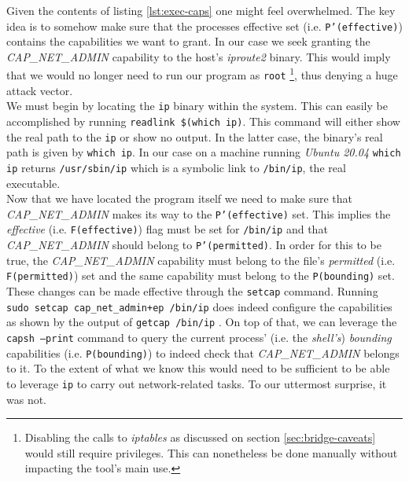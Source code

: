         Given the contents of listing \ref{lst:exec-caps} one might feel overwhelmed. The key idea is to somehow make sure that the processes effective set (i.e. \texttt{P'(effective)}) contains the capabilities we want to grant. In our case we seek granting the \textit{CAP\_NET\_ADMIN} capability to the host's \textit{iproute2} binary. This would imply that we would no longer need to run our program as \texttt{root} \footnote{Disabling the calls to \textit{iptables} as discussed on section \ref{sec:bridge-caveats} would still require privileges. This can nonetheless be done manually without impacting the tool's main use.}, thus denying a huge attack vector.\\

        We must begin by locating the \texttt{ip} binary within the system. This can easily be accomplished by running \texttt{\allowbreak readlink \$(which ip)}. This command will either show the real path to the \texttt{ip} or show no output. In the latter case, the binary's real path is given by \texttt{which ip}. In our case on a machine running \textit{Ubuntu 20.04} \texttt{which ip} returns \texttt{/usr/sbin/ip} which is a symbolic link to \texttt{/bin/ip}, the real executable.\\

        Now that we have located the program itself we need to make sure that \textit{CAP\_NET\_ADMIN} makes its way to the \texttt{P'(effective)} set. This implies the \textit{effective} (i.e. \texttt{F(effective)}) flag must be set for \texttt{/bin/ip} and that \textit{CAP\_NET\_ADMIN} should belong to \texttt{P'(permitted)}. In order for this to be true, the \textit{CAP\_NET\_ADMIN} capability must belong to the file's \textit{permitted} (i.e. \texttt{F(permitted)}) set and the same capability must belong to the \texttt{P(bounding)} set.\\

        These changes can be made effective through the \texttt{setcap} \cite{bib:man-setcap} command. Running \texttt{sudo setcap cap\_net\_admin+ep /bin/ip} does indeed configure the capabilities as shown by the output of \texttt{getcap /bin/ip} \cite{bib:man-getcap}. On top of that, we can leverage the \texttt{capsh --print} \cite{bib:man-capsh} command to query the current process' (i.e. the \textit{shell's}) \textit{bounding} capabilities (i.e. \texttt{P(bounding)}) to indeed check that \textit{CAP\_NET\_ADMIN} belongs to it. To the extent of what we know this would need to be sufficient to be able to leverage \texttt{ip} to carry out network-related tasks. To our uttermost surprise, it was not.\\

